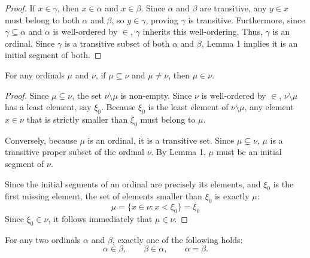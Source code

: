 \documentclass[11pt]{article}
\begin{document}
\begin{proof}
If $x \in \gamma$, then $x \in \alpha$ and $x \in \beta$. Since $\alpha$ and $\beta$ are transitive, any $y \in x$ must belong to both $\alpha$ and $\beta$, so $y \in \gamma$, proving $\gamma$ is transitive. Furthermore, since $\gamma \subseteq \alpha$ and $\alpha$ is well-ordered by $\in$, $\gamma$ inherits this well-ordering. Thus, $\gamma$ is an ordinal. Since $\gamma$ is a transitive subset of both $\alpha$ and $\beta$, Lemma 1 implies it is an initial segment of both.
\end{proof}

\begin{lemma}
For any ordinals $\mu$ and $\nu$, if $\mu \subseteq \nu$ and $\mu \neq \nu$, then $\mu \in \nu$.
\end{lemma}

\begin{proof}
Since $\mu \subsetneq \nu$, the set $\nu \setminus \mu$ is non-empty. Since $\nu$ is well-ordered by $\in$, $\nu \setminus \mu$ has a least element, say $\xi_0$. Because $\xi_0$ is the least element of $\nu \setminus \mu$, any element $x \in \nu$ that is strictly smaller than $\xi_0$ must belong to $\mu$. 

Conversely, because $\mu$ is an ordinal, it is a transitive set. Since $\mu \subsetneq \nu$, $\mu$ is a transitive proper subset of the ordinal $\nu$. By Lemma 1, $\mu$ must be an initial segment of $\nu$. 

Since the initial segments of an ordinal are precisely its elements, and $\xi_0$ is the first missing element, the set of elements smaller than $\xi_0$ is exactly $\mu$:
\[
\mu = \{x \in \nu : x < \xi_0\} = \xi_0
\]
Since $\xi_0 \in \nu$, it follows immediately that $\mu \in \nu$.
\end{proof}

\begin{theorem}
For any two ordinals $\alpha$ and $\beta$, exactly one of the following holds:
\[
\alpha \in \beta, \qquad \beta \in \alpha, \qquad \alpha = \beta.
\]
\end{theorem}
\end{document}
